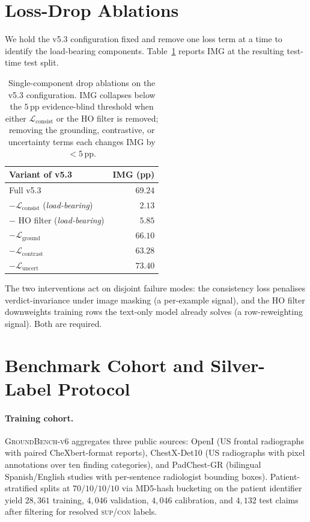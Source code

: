 \documentclass{article}
\begin{document}
\section{Loss-Drop Ablations}
\label{app:ablations}

We hold the v5.3 configuration fixed and remove one loss term at a time
to identify the load-bearing components. Table~\ref{tab:ablations}
reports IMG at the resulting test-time test split.

\begin{table}[t]
\centering
\small
\caption{Single-component drop ablations on the v5.3 configuration. IMG
collapses below the $5$\,pp evidence-blind threshold when either
$\mathcal{L}_{\mathrm{consist}}$ or the HO filter is removed; removing
the grounding, contrastive, or uncertainty terms each changes IMG by
$< 5$\,pp.}
\label{tab:ablations}
\begin{tabular}{lr}
\toprule
\textbf{Variant of v5.3} & \textbf{IMG (pp)} \\
\midrule
Full v5.3 & $69.24$ \\
$-\mathcal{L}_{\mathrm{consist}}$ (\emph{load-bearing}) & $\phantom{0}2.13$ \\
$-$ HO filter (\emph{load-bearing}) & $\phantom{0}5.85$ \\
$-\mathcal{L}_{\mathrm{ground}}$ & $66.10$ \\
$-\mathcal{L}_{\mathrm{contrast}}$ & $63.28$ \\
$-\mathcal{L}_{\mathrm{uncert}}$ & $73.40$ \\
\bottomrule
\end{tabular}
\end{table}

The two interventions act on disjoint failure modes: the consistency
loss penalises verdict-invariance under image masking (a per-example
signal), and the HO filter downweights training rows the text-only model
already solves (a row-reweighting signal). Both are required.

\section{Benchmark Cohort and Silver-Label Protocol}
\label{app:benchmark}

\paragraph{Training cohort.} \textsc{GroundBench-v6}
aggregates three public sources: OpenI \citep{demner2016openi} (US
frontal radiographs with paired CheXbert-format reports), ChestX-Det10
\citep{liu2020chestxdet} (US radiographs with pixel annotations over
ten finding categories), and PadChest-GR \citep{castro2024padchestgr}
(bilingual Spanish/English studies with per-sentence radiologist
bounding boxes). Patient-stratified splits at $70/10/10/10$ via
MD5-hash bucketing on the patient identifier yield $28{,}361$ training,
$4{,}046$ validation, $4{,}046$ calibration, and $4{,}132$ test claims
after filtering for resolved \textsc{sup}/\textsc{con} labels.
\end{document}
